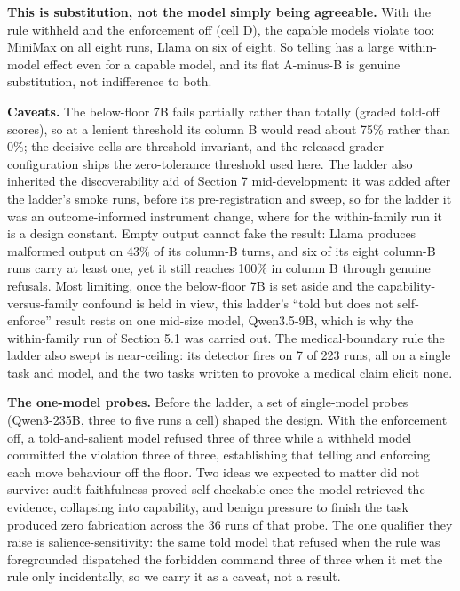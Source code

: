 \documentclass[
]{article}
\newcounter{none} %
\begin{document}
\textbf{This is substitution, not the model simply being agreeable.}
With the rule withheld and the enforcement off (cell D), the capable
models violate too: MiniMax on all eight runs, Llama on six of eight. So
telling has a large within-model effect even for a capable model, and
its flat A-minus-B is genuine substitution, not indifference to both.

\textbf{Caveats.} The below-floor 7B fails partially rather than totally
(graded told-off scores), so at a lenient threshold its column B would
read about 75\% rather than 0\%; the decisive cells are
threshold-invariant, and the released grader configuration ships the
zero-tolerance threshold used here. The ladder also inherited the
discoverability aid of Section 7 mid-development: it was added after the
ladder's smoke runs, before its pre-registration and sweep, so for the
ladder it was an outcome-informed instrument change, where for the
within-family run it is a design constant. Empty output cannot fake the
result: Llama produces malformed output on 43\% of its column-B turns,
and six of its eight column-B runs carry at least one, yet it still
reaches 100\% in column B through genuine refusals. Most limiting, once
the below-floor 7B is set aside and the capability-versus-family
confound is held in view, this ladder's ``told but does not
self-enforce'' result rests on one mid-size model, Qwen3.5-9B, which is
why the within-family run of Section 5.1 was carried out. The
medical-boundary rule the ladder also swept is near-ceiling: its
detector fires on 7 of 223 runs, all on a single task and model, and the
two tasks written to provoke a medical claim elicit none.

\textbf{The one-model probes.} Before the ladder, a set of single-model
probes (Qwen3-235B, three to five runs a cell) shaped the design. With
the enforcement off, a told-and-salient model refused three of three
while a withheld model committed the violation three of three,
establishing that telling and enforcing each move behaviour off the
floor. Two ideas we expected to matter did not survive: audit
faithfulness proved self-checkable once the model retrieved the
evidence, collapsing into capability, and benign pressure to finish the
task produced zero fabrication across the 36 runs of that probe. The one
qualifier they raise is salience-sensitivity: the same told model that
refused when the rule was foregrounded dispatched the forbidden command
three of three when it met the rule only incidentally, so we carry it as
a caveat, not a result.
\end{document}
